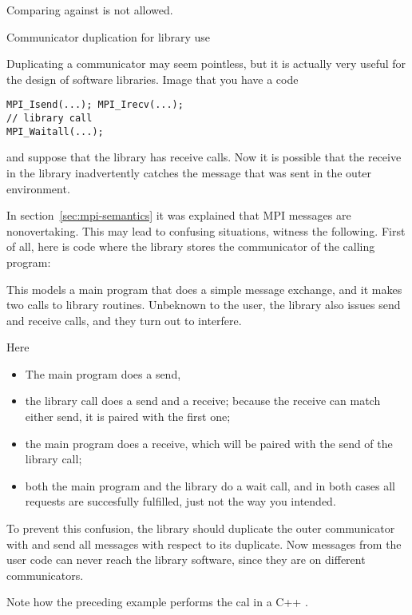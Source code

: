 Comparing against  is not allowed.

 {Communicator duplication for library use}
\label{sec:mpi-comm-dup-lib}

Duplicating a communicator may seem pointless, but it is actually very useful for the design of
software libraries. Image that you have a code
\lstset{style=reviewcode,language=C}
\begin{lstlisting}
MPI_Isend(...); MPI_Irecv(...);
// library call
MPI_Waitall(...);
\end{lstlisting}
and suppose that the library has receive calls. Now it is possible that the 
receive in the library inadvertently
catches the message that was sent in the outer environment.

In section~\ref{sec:mpi-semantics} it was explained that MPI messages are 
nonovertaking. This may lead to confusing situations, witness the following.
First of all, here is code where the library stores the communicator
of the calling program:
%

This models a main program that does a simple message exchange, and it
makes two calls to library routines. Unbeknown to the user, the
library also issues send and receive calls, and they turn out to
interfere.

Here
\begin{itemize}
\item The main program does a send,
\item the library call  does a send and a receive;
  because the receive can match either send, it is paired with the
  first one;
\item the main program does a receive, which will be paired with the send of the 
  library call;
\item both the main program and the library do a wait call, and in
  both cases all requests are succesfully fulfilled, just not the way
  you intended.
\end{itemize}

To prevent this confusion, the library should duplicate the outer
communicator with 
%
and send all messages with respect to its duplicate. Now messages from the user
code can never reach the library software, since they are on different communicators.


Note how the preceding example
performs the 
cal in a C++ .


